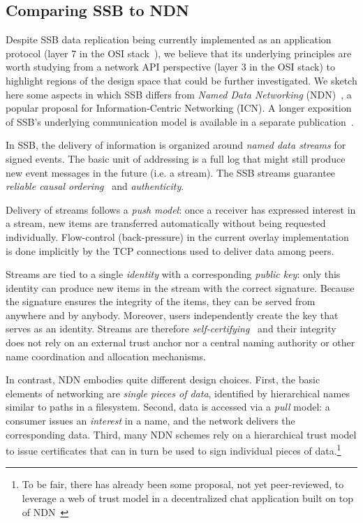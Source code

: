 \documentclass[9pt,sigconf]{acmart}
\begin{document}
\subsection*{Comparing SSB to NDN}

Despite SSB data replication being currently implemented as an
application protocol (layer 7 in the OSI
stack~\cite{briscoe2000understanding}), we believe that its underlying
principles are worth studying from a network API perspective (layer 3 in
the OSI stack) to highlight regions of the design space that could be
further investigated. We sketch here some aspects in which SSB differs
from \textit{Named Data Networking} (NDN)~\cite{ahlgren2012survey}, a
popular proposal for Information-Centric Networking (ICN). A longer
exposition of SSB's underlying communication model is available in a
separate publication~\cite{tschudin2019broadcast}.

In SSB, the delivery of information is organized around \textit{named
  data streams} for signed events. The basic unit of addressing is a
full log that might still produce new event messages in the future
(i.e. a stream). The SSB streams guarantee \textit{reliable causal
  ordering}~\cite{cachin2011introduction} and \textit{authenticity}.

Delivery of streams follows a \textit{push model}: once a receiver has expressed interest in a stream, new items are transferred automatically without being requested individually. Flow-control (back-pressure) in the current overlay implementation is done implicitly by the TCP connections used to deliver data among peers.

Streams are tied to a single \textit{identity} with a corresponding
\textit{public key}: only this identity can produce new items in the
stream with the correct signature.  Because the signature ensures the
integrity of the items, they can be served from anywhere and by
anybody.
Moreover, users independently create the key that serves as an
identity. Streams are therefore
\textit{self-certifying}~\cite{mazieres1998selfcertifyingpathnames}
and their integrity does not rely on an external trust anchor nor a
central naming authority or other name coordination and allocation
mechanisms.

In contrast, NDN embodies quite different design choices. First, the basic elements of networking are \textit{single pieces of data}, identified by hierarchical names similar to paths in a filesystem. Second, data is accessed via a \textit{pull} model: a consumer issues an \textit{interest} in a name, and the network delivers the corresponding data. Third, many NDN schemes rely on a hierarchical trust model to issue certificates that can in turn be used to sign individual pieces of data.\footnote{To be fair, there has already been some proposal, not yet peer-reviewed, to leverage a web of trust model in a decentralized chat application built on top of NDN~\cite{zhu2012chronos}}
\end{document}

